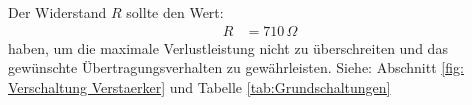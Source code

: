 {    Der Widerstand $R$ sollte den Wert:
    \begin{align*}
        R &= 710\,\Omega
    \end{align*}
    haben, um die maximale Verlustleistung nicht zu überschreiten und das gewünschte Übertragungsverhalten zu gewährleisten.
%        
%        
%        
%        
%        
%        
%        
%        
%        
Siehe: Abschnitt \ref{fig: Verschaltung Verstaerker} und Tabelle \ref{tab:Grundschaltungen}

    }